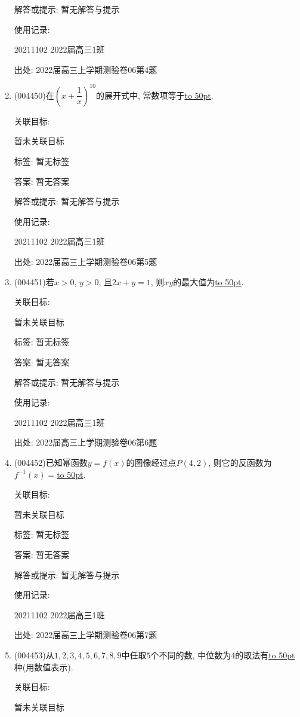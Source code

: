\documentclass[10pt,a4paper]{article}
\newcommand{\blank}[1]{\underline{\hbox to #1pt{}}}
\begin{document}
\begin{enumerate}[1.]
解答或提示: 暂无解答与提示

使用记录:

20211102	2022届高三1班	


出处: 2022届高三上学期测验卷06第4题
\item { (004450)}在$(x+\dfrac 1x)^{10}$的展开式中, 常数项等于\blank{50}.


关联目标:

暂未关联目标



标签: 暂无标签

答案: 暂无答案

解答或提示: 暂无解答与提示

使用记录:

20211102	2022届高三1班	


出处: 2022届高三上学期测验卷06第5题
\item { (004451)}若$x>0$, $y>0$, 且$2x+y=1$, 则$xy$的最大值为\blank{50}.


关联目标:

暂未关联目标



标签: 暂无标签

答案: 暂无答案

解答或提示: 暂无解答与提示

使用记录:

20211102	2022届高三1班	


出处: 2022届高三上学期测验卷06第6题
\item { (004452)}已知幂函数$y=f(x)$的图像经过点$P(4,2)$, 则它的反函数为$f^{-1}(x)=$\blank{50}.


关联目标:

暂未关联目标



标签: 暂无标签

答案: 暂无答案

解答或提示: 暂无解答与提示

使用记录:

20211102	2022届高三1班	


出处: 2022届高三上学期测验卷06第7题
\item { (004453)}从$1,2,3,4,5,6,7,8,9$中任取$5$个不同的数, 中位数为$4$的取法有\blank{50}种(用数值表示).


关联目标:

暂未关联目标




\end{enumerate}
\end{document}
